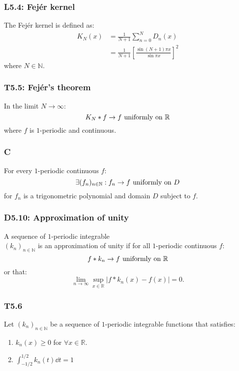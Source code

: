 \documentclass{article}
\begin{document}
\begin{multicols*}{3}
\subsubsection*{L5.4: Fej\'er kernel}
The Fej\'er kernel is defined as:
\begin{align*}
    K_N(x)
    &=\frac{1}{N+1}
    \sum_{n=0}^{N}D_n(x) \\
    &=\frac{1}{N+1}
    \left[\frac{\sin(N+1)\pi x}
    {\sin\pi x}\right]^2
\end{align*}
where $N\in\mathbb{N}$.

\subsubsection*{T5.5: Fej\'er's theorem}
In the limit $N\rightarrow\infty$:
$$K_N*f\rightarrow f\hspace{0.05in}
\text{uniformly on $\mathbb{R}$}$$
where $f$ is $1$-periodic and continuous.

\subsubsection*{C}
For every $1$-periodic continuous $f$:
$$\exists(f_n)_{n\in\mathbb{N}}
:f_n\rightarrow f\hspace{0.05in}\text{uniformly on $D$}$$
for $f_n$ is a trigonometric polynomial
and domain $D$ subject to $f$.

\subsubsection*{D5.10: Approximation of unity}
A sequence of $1$-periodic integrable \\
$(k_n)_{n\in\mathbb{N}}$ is an approximation
of unity if for all $1$-periodic continuous $f$:
$$f*k_n\rightarrow f\hspace{0.05in}
\text{uniformly on $\mathbb{R}$}$$
or that:
$$\lim_{n\rightarrow\infty}
\sup_{x\in\mathbb{R}}
|f*k_n(x)-f(x)|=0.$$

\subsubsection*{T5.6}
Let $(k_n)_{n\in\mathbb{N}}$ be
a sequence of $1$-periodic integrable functions
that satisfies:
\begin{enumerate}
    \item $k_n(x)\geq0$ for $\forall x\in\mathbb{R}$.
    
    \item $\displaystyle
    \int_{-1/2}^{1/2}k_n(t)\dd t=1$


\end{enumerate}
\end{multicols*}
\end{document}
